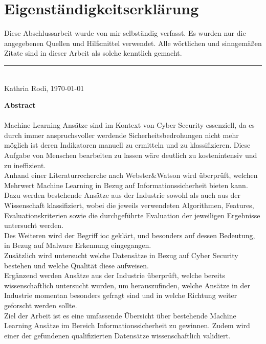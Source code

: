 \documentclass[
    12pt, %
    DIV10,
    ngerman, %
    a4paper, %
    oneside, %
    titlepage, %
    parskip=half, %
    headings=normal, %
    listof=totoc, %
    bibliography=totoc, %
    index=totoc, %
    captions=tableheading, %
    final %
]{scrreprt}
\begin{document}
\section*{Eigenständigkeitserklärung}
Diese Abschlussarbeit wurde von mir selbständig verfasst. Es wurden nur die angegebenen
Quellen und Hilfsmittel verwendet. Alle wörtlichen und sinngemä{\ss}en Zitate
sind in dieser Arbeit als solche kenntlich gemacht.
\begin{center}
\end{center}
\rule[0.5em]{25em}{0.5pt} \\
Kathrin Rodi, \today
 \begin{center}
 \end{center}
\newpage
\noindent \textbf{Abstract}\\\\
\noindent Machine Learning Ansätze sind im Kontext von Cyber Security essenziell, da es durch immer anspruchsvoller werdende Sicherheitsbedrohungen nicht mehr möglich ist deren Indikatoren manuell zu ermitteln und zu klassifizieren. Diese Aufgabe von Menschen bearbeiten zu lassen wäre deutlich zu kostenintensiv und zu ineffizient.\\
\noindent Anhand einer Literaturrecherche nach Webster\&Watson wird überprüft, welchen Mehrwert Machine Learning in Bezug auf Informationssicherheit bieten kann. Dazu werden bestehende Ansätze aus der Industrie sowohl als auch aus der Wissenschaft klassifiziert, wobei die jeweils verwendeten Algorithmen, Features, Evaluationskriterien sowie die durchgeführte Evaluation der jeweiligen Ergebnisse untersucht werden.\\
\noindent Des Weiteren wird der Begriff \acf{ioc} geklärt, und besonders auf dessen Bedeutung, in Bezug auf Malware Erkennung eingegangen.\\
\noindent Zusätzlich wird untersucht welche Datensätze in Bezug auf Cyber Security bestehen und welche Qualität diese aufweisen.\\
\noindent Ergänzend werden Ansätze aus der Industrie überprüft, welche bereits wissenschaftlich untersucht wurden, um herauszufinden, welche Ansätze in der Industrie momentan besonders gefragt sind und in welche Richtung weiter geforscht werden sollte.\\
\noindent Ziel der Arbeit ist es eine umfassende Übersicht über bestehende Machine Learning Ansätze im Bereich Informationssicherheit zu gewinnen. Zudem wird einer der gefundenen qualifizierten Datensätze wissenschaftlich validiert. 
\end{document}
